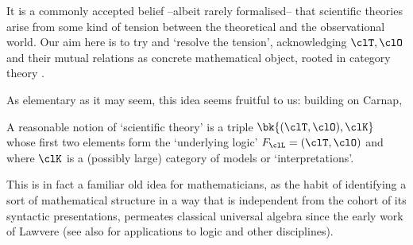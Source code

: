 It is a commonly accepted belief --albeit rarely formalised-- that scientific theories arise from some kind of tension between the theoretical and the observational world. Our aim here is to try and `resolve the tension', acknowledging $\clT,\clO$ and their mutual relations as concrete mathematical object, rooted in category theory \cite{McL,pedicchiofoundations,riehlcontext,leinster2014basic}.

As elementary as it may seem, this idea seems fruitful to us: building on Carnap,
\begin{remark*}
	A reasonable notion of `scientific theory' is a triple $\bk{(\clT,\clO), \clK}$ whose first two elements form the `underlying logic' $F_\clL=(\clT,\clO)$ and where $\clK$ is a (possibly large) category of models or `interpretations'.
\end{remark*}
This is in fact a familiar old idea for mathematicians, as the habit of identifying a sort of mathematical structure in a way that is independent from the cohort of its syntactic presentations, permeates classical universal algebra since the early work of Lawvere \cite{lawvere1963functorial,lawvere1996unity} (see also \cite{abramskyno,Borceux1994,makkai1989accessible} for applications to logic and other disciplines).

